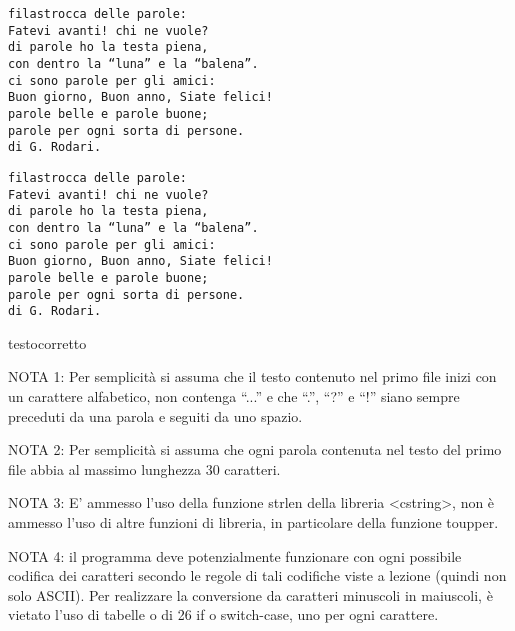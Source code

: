 \documentclass{article}
\begin{document}
\begin{table}[h!]
   \begin{minipage}[c]{0.45\linewidth}
      \begin{verbatim}
filastrocca delle parole:
Fatevi avanti! chi ne vuole?
di parole ho la testa piena,
con dentro la “luna” e la “balena”.
ci sono parole per gli amici:
Buon giorno, Buon anno, Siate felici!
parole belle e parole buone;
parole per ogni sorta di persone.
di G. Rodari.
      \end{verbatim}
      \captionsetup{justification=centering}
   \end{minipage}
   \hspace{0.5cm}
   \begin{minipage}[c]{0.45\linewidth}
      \begin{verbatim}
filastrocca delle parole:
Fatevi avanti! chi ne vuole?
di parole ho la testa piena,
con dentro la “luna” e la “balena”.
ci sono parole per gli amici:
Buon giorno, Buon anno, Siate felici!
parole belle e parole buone;
parole per ogni sorta di persone.
di G. Rodari.
         \end{verbatim}
      \captionsetup{justification=centering}
      \caption{testocorretto}
   \end{minipage}
\end{table}

NOTA 1: Per semplicità si assuma che il testo contenuto nel primo file inizi con un carattere alfabetico, non contenga “...” e che “.”, “?” e “!” siano sempre preceduti da una parola e seguiti da uno spazio.

NOTA 2: Per semplicità si assuma che ogni parola contenuta nel testo del primo file abbia al massimo lunghezza 30 caratteri.

NOTA 3: E' ammesso l'uso della funzione strlen della libreria <cstring>, non è ammesso l'uso di altre funzioni di libreria, in particolare della funzione toupper.

NOTA 4: il programma deve potenzialmente funzionare con ogni possibile codifica dei caratteri secondo le regole di tali codifiche viste a lezione (quindi non solo ASCII). Per realizzare la conversione da caratteri minuscoli in maiuscoli, è vietato l'uso di tabelle o di 26 if o switch-case, uno per ogni carattere.
\end{document}

